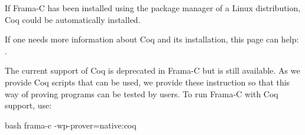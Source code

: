 \begin{Information}
  If Frama-C has been installed using the package manager of a Linux
  distribution, Coq could be automatically installed.
\end{Information}


If one needs more information about Coq and its installation, this page
can help: .



The current support of Coq is deprecated in Frama-C but is still available.
As we provide Coq scripts that can be used, we provide these instruction
so that this way of proving programs can be tested by users. To run Frama-C
with Coq support, use:



\begin{CodeBlock}{bash}
  frama-c -wp-prover=native:coq
\end{CodeBlock}
